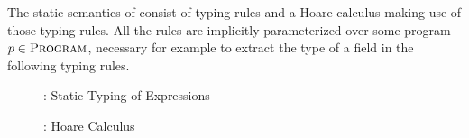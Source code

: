 The static semantics of \svl consist of typing rules and a Hoare calculus making use of those typing rules.
All the rules are implicitly parameterized over some program $p \in \textsc{Program}$, necessary for example to extract the type of a field in the following typing rules.

\begin{figure}[h]
    
    \caption{\svl: Static Typing of Expressions}
\end{figure}

\begin{figure}[h!]
    
    \caption{\svl: Hoare Calculus} 
\end{figure}

%